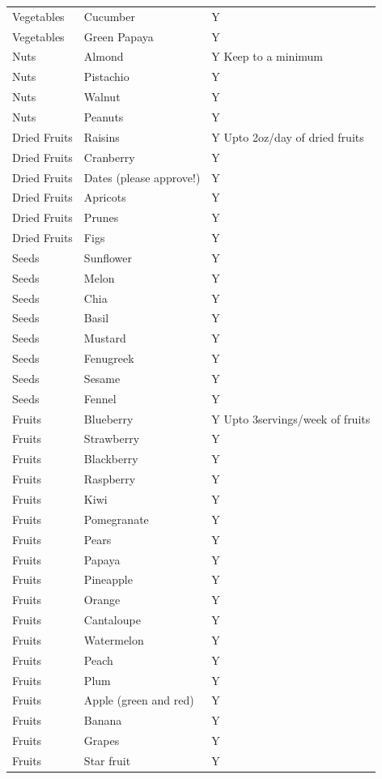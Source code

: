 \documentclass[
  oneside]{book}
\begin{document}
\begin{longtable}[t]{lll}
Vegetables & Cucumber & Y\\
Vegetables & Green Papaya & Y\\
Nuts & Almond & Y
Keep to a minimum\\
\addlinespace
Nuts & Pistachio & Y\\
Nuts & Walnut & Y\\
Nuts & Peanuts & Y\\
Dried Fruits & Raisins & Y
Upto 2oz/day of dried fruits\\
Dried Fruits & Cranberry & Y\\
\addlinespace
Dried Fruits & Dates (please approve!) & Y\\
Dried Fruits & Apricots & Y\\
Dried Fruits & Prunes & Y\\
Dried Fruits & Figs & Y\\
Seeds & Sunflower & Y\\
\addlinespace
Seeds & Melon & Y\\
Seeds & Chia & Y\\
Seeds & Basil & Y\\
Seeds & Mustard & Y\\
Seeds & Fenugreek & Y\\
\addlinespace
Seeds & Sesame & Y\\
Seeds & Fennel & Y\\
Fruits & Blueberry & Y
Upto 3servings/week of fruits\\
Fruits & Strawberry & Y\\
Fruits & Blackberry & Y\\
\addlinespace
Fruits & Raspberry & Y\\
Fruits & Kiwi & Y\\
Fruits & Pomegranate & Y\\
Fruits & Pears & Y\\
Fruits & Papaya & Y\\
\addlinespace
Fruits & Pineapple & Y\\
Fruits & Orange & Y\\
Fruits & Cantaloupe & Y\\
Fruits & Watermelon & Y\\
Fruits & Peach & Y\\
\addlinespace
Fruits & Plum & Y\\
Fruits & Apple (green and red) & Y\\
Fruits & Banana & Y\\
Fruits & Grapes & Y\\
Fruits & Star fruit & Y\\

\end{longtable}
\end{document}
